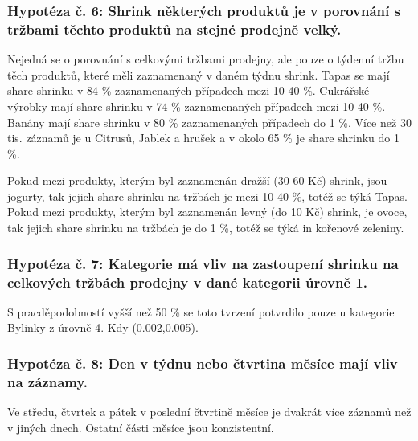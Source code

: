 \subsubsection*{Hypotéza č. 6: Shrink některých produktů je v porovnání s tržbami těchto produktů na stejné prodejně velký.}

Nejedná se o porovnání s celkovými tržbami prodejny, ale pouze o týdenní tržbu těch produktů, které měli zaznamenaný v daném týdnu shrink.
Tapas se mají share shrinku v 84 \% zaznamenaných případech mezi 10-40 \%.
 Cukrářské výrobky  mají share shrinku v 74 \% zaznamenaných případech mezi 10-40 \%.
 Banány mají share shrinku v 80 \% zaznamenaných případech do 1 \%.
 Více než 30 tis. záznamů je u Citrusů, Jablek a hrušek a v okolo 65 \% je share shrinku do 1 \%.

 Pokud mezi produkty, kterým byl zaznamenán dražší (30-60 Kč) shrink, jsou jogurty, tak jejich share shrinku na tržbách je mezi 10-40 \%, totéž se týká Tapas.
Pokud mezi produkty, kterým byl zaznamenán levný (do 10 Kč) shrink, je ovoce, tak jejich share shrinku na tržbách je do 1 \%, totéž se týká in kořenové zeleniny.

\subsubsection*{Hypotéza č. 7: Kategorie má vliv na zastoupení shrinku na celkových tržbách prodejny v dané kategorii úrovně 1.}

S pracděpodobností vyšší než 50 \% se toto tvrzení potvrdilo pouze u kategorie Bylinky z úrovně 4. Kdy (0.002,0.005).

\subsubsection*{Hypotéza č. 8: Den v týdnu nebo čtvrtina měsíce mají vliv na záznamy.}

Ve středu, čtvrtek a pátek v poslední čtvrtině měsíce je dvakrát více záznamů než v jiných dnech. Ostatní části měsíce jsou konzistentní.